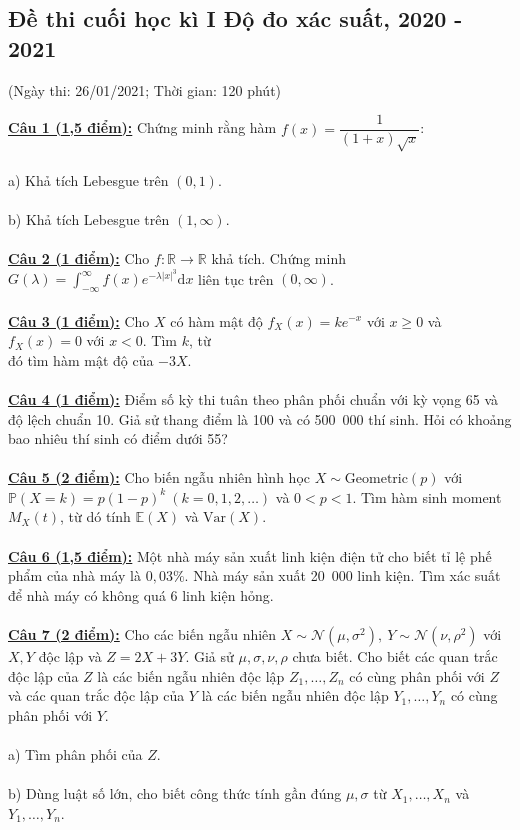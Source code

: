 \documentclass[10pt, a4paper]{article}
\begin{document}
\newpage

\subsection{Đề thi cuối học kì I Độ đo xác suất, 2020 - 2021}
\begin{center}
	\color{blue}(Ngày thi: 26/01/2021; Thời gian: 120 phút)
\end{center}
\color{red}\underline{\textbf{Câu 1 (1,5 điểm):}} \color{black}Chứng minh rằng hàm $f(x)=\dfrac{1}{(1+x)\sqrt x}$:\\\\
\color{red}a) \color{black}Khả tích Lebesgue trên $(0,1)$.\\\\
\color{red}b) \color{black}Khả tích Lebesgue trên $(1,\infty)$.\\\\
\color{red}\underline{\textbf{Câu 2 (1 điểm):}} \color{black}Cho $f:\mathbb R\rightarrow\mathbb R$ khả tích. Chứng minh $G(\lambda)=\displaystyle\int_{-\infty}^\infty f(x)e^{-\lambda|x|^3}\text{d}x$ liên tục trên $(0,\infty)$.\\\\
\color{red}\underline{\textbf{Câu 3 (1 điểm):}} \color{black}Cho $X$ có hàm mật độ $f_X(x)=ke^{-x}$ với $x\ge0$ và $f_X(x)=0$ với $x<0$. Tìm $k$, từ\\ đó tìm hàm mật độ của $-3X$.\\\\
\color{red}\underline{\textbf{Câu 4 (1 điểm):}} \color{black}Điểm số kỳ thi tuân theo phân phối chuẩn với kỳ vọng 65 và độ lệch chuẩn 10. Giả sử thang điểm là 100 và có 500~000 thí sinh. Hỏi có khoảng bao nhiêu thí sinh có điểm dưới 55?\\\\
\color{red}\underline{\textbf{Câu 5 (2 điểm):}} \color{black}Cho biến ngẫu nhiên hình học $X\sim\text{Geometric}(p)$ với $\mathbb P(X=k)=p(1-p)^k~(k=0,1,2,\dots)$ và $0<p<1$. Tìm hàm sinh moment $M_X(t)$, từ dó tính $\mathbb E(X)$ và $\text{Var}(X)$.\\\\
\color{red}\underline{\textbf{Câu 6 (1,5 điểm):}} \color{black}Một nhà máy sản xuất linh kiện điện tử cho biết tỉ lệ phế phẩm của nhà máy là $0,03\%$. Nhà máy sản xuất 20~000 linh kiện. Tìm xác suất để nhà máy có không quá 6 linh kiện hỏng.\\\\
\color{red}\underline{\textbf{Câu 7 (2 điểm):}} \color{black}Cho các biến ngẫu nhiên $X\sim\mathcal N(\mu,\sigma^2),~Y\sim\mathcal N(\nu,\rho^2)$ với $X,Y$ độc lập và $Z=2X+3Y$. Giả sử $\mu,\sigma,\nu,\rho$ chưa biết. Cho biết các quan trắc độc lập của $Z$ là các biến ngẫu nhiên độc lập $Z_1,\dots,Z_n$ có cùng phân phối với $Z$ và các quan trắc độc lập của $Y$ là các biến ngẫu nhiên độc lập $Y_1,\dots,Y_n$ có cùng phân phối với $Y$.\\\\
\color{red}a) \color{black}Tìm phân phối của $Z$.\\\\
\color{red}b) \color{black}Dùng luật số lớn, cho biết công thức tính gần đúng $\mu,\sigma$ từ $X_1,\dots,X_n$ và $Y_1,\dots,Y_n$.
\end{document}
